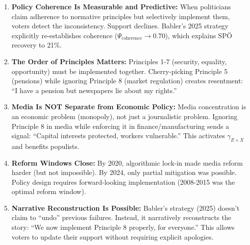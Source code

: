 \begin{tcolorbox}[colback=green!5!white, colframe=green!75!black,
    title=Practical Implications]

\begin{enumerate}

\item \textbf{Policy Coherence Is Measurable and Predictive:}
When politicians claim adherence to normative principles but selectively implement them, voters detect the inconsistency. Support declines. Babler's 2025 strategy explicitly re-establishes coherence ($\Psi_{\text{coherence}} \rightarrow 0.70$), which explains SPÖ recovery to 21\%.

\item \textbf{The Order of Principles Matters:}
Principles 1-7 (security, equality, opportunity) must be implemented together. Cherry-picking Principle 5 (pensions) while ignoring Principle 8 (market regulation) creates resentment: ``I have a pension but newspapers lie about my rights.''

\item \textbf{Media Is NOT Separate from Economic Policy:}
Media concentration is an economic problem (monopoly), not just a journalistic problem. Ignoring Principle 8 in media while enforcing it in finance/manufacturing sends a signal: ``Capital interests protected, workers vulnerable.'' This activates $\gamma_{E \times X}$ and benefits populists.

\item \textbf{Reform Windows Close:}
By 2020, algorithmic lock-in made media reform harder (but not impossible). By 2024, only partial mitigation was possible. Policy design requires forward-looking implementation (2008-2015 was the optimal reform window).

\item \textbf{Narrative Reconstruction Is Possible:}
Babler's strategy (2025) doesn't claim to ``undo'' previous failures. Instead, it narratively reconstructs the story: ``We now implement Principle 8 properly, for everyone.'' This allows voters to update their support without requiring explicit apologies.

\end{enumerate}

\end{tcolorbox}


